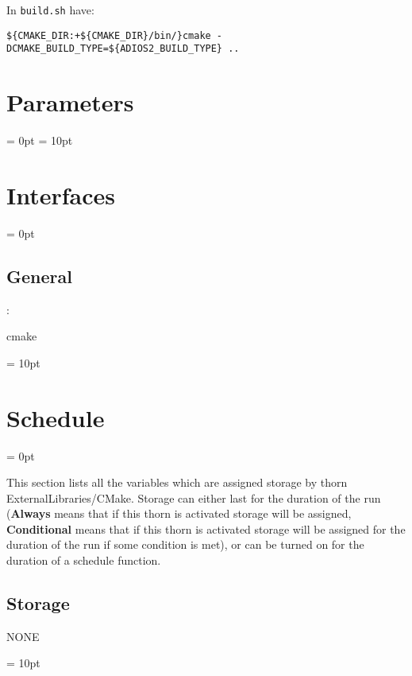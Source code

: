 \documentclass{article}
\begin{document}
In \texttt{build.sh} have:

\begin{verbatim}
${CMAKE_DIR:+${CMAKE_DIR}/bin/}cmake -DCMAKE_BUILD_TYPE=${ADIOS2_BUILD_TYPE} ..
\end{verbatim}




\section{Parameters} 


\parskip = 0pt
\parskip = 10pt 

\section{Interfaces} 


\parskip = 0pt

\vspace{3mm} \subsection*{General}

: 

cmake
\vspace{2mm}

\vspace{5mm}\parskip = 10pt 

\section{Schedule} 


\parskip = 0pt


\noindent This section lists all the variables which are assigned storage by thorn ExternalLibraries/CMake.  Storage can either last for the duration of the run ({\bf Always} means that if this thorn is activated storage will be assigned, {\bf Conditional} means that if this thorn is activated storage will be assigned for the duration of the run if some condition is met), or can be turned on for the duration of a schedule function.


\subsection*{Storage}NONE

\vspace{5mm}\parskip = 10pt 
\end{document}
